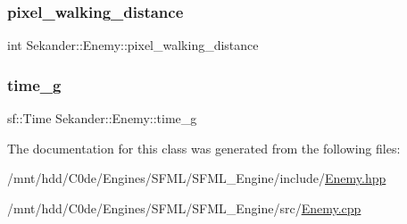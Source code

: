 \mbox{\label{classSekander_1_1Enemy_a44be07820e6bb5f22675a3096d9fd12e}} 
\subsubsection{\texorpdfstring{pixel\+\_\+walking\+\_\+distance}{pixel\_walking\_distance}}
{\footnotesize\ttfamily int Sekander\+::\+Enemy\+::pixel\+\_\+walking\+\_\+distance\hspace{0.3cm}{\ttfamily [private]}}

\mbox{\label{classSekander_1_1Enemy_a1ad3f90651834f3f27b4a1c415b5ae15}} 
\subsubsection{\texorpdfstring{time\+\_\+g}{time\_g}}
{\footnotesize\ttfamily sf\+::\+Time Sekander\+::\+Enemy\+::time\+\_\+g\hspace{0.3cm}{\ttfamily [private]}}



The documentation for this class was generated from the following files\+:\begin{DoxyCompactItemize}
\item 
/mnt/hdd/\+C0de/\+Engines/\+S\+F\+M\+L/\+S\+F\+M\+L\+\_\+\+Engine/include/\hyperlink{Enemy_8hpp}{Enemy.\+hpp}\item 
/mnt/hdd/\+C0de/\+Engines/\+S\+F\+M\+L/\+S\+F\+M\+L\+\_\+\+Engine/src/\hyperlink{Enemy_8cpp}{Enemy.\+cpp}\end{DoxyCompactItemize}

